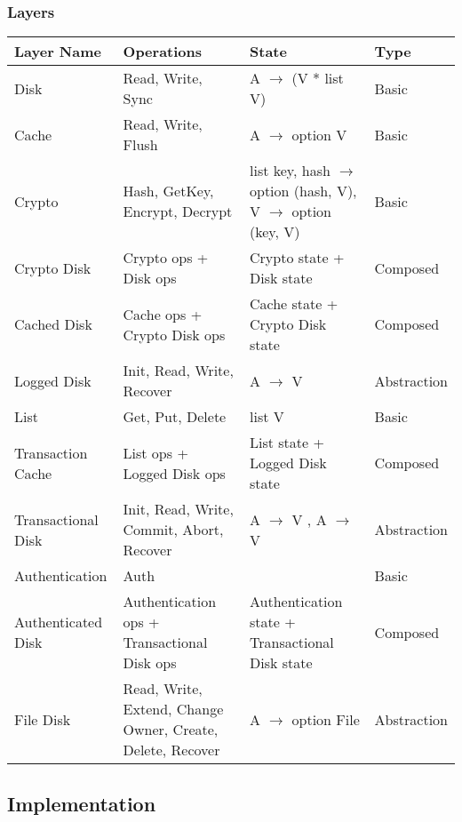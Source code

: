 \documentclass[onecolumn]{paper}
\begin{document}
		\subsubsection{Layers}
			\begin{tabularx}{\linewidth}{|L|L|L|L|}
				\hline
				Layer Name &
				Operations &
				State &
				Type \\
				\hline
				Disk &
				Read, Write, Sync &
				A $\rightarrow$ (V * list V) &
				Basic \\
				\hline
				Cache &
				Read, Write, Flush &
				A $\rightarrow$ option V &
				Basic \\
				\hline
				Crypto &
				Hash, GetKey, Encrypt, Decrypt &
				list key,
				hash $\rightarrow$ option (hash, V),
				V $\rightarrow$ option (key, V) &
				Basic \\
				\hline
				Crypto Disk &
				Crypto ops + Disk ops &
				Crypto state + Disk state &
				Composed \\
				\hline
				Cached Disk &
				Cache ops + Crypto Disk ops &
				Cache state + Crypto Disk state &
				Composed \\
				\hline
				Logged Disk &
				Init, Read, Write, Recover &
				A $\rightarrow$ V &
				Abstraction \\ 
				\hline
				List &
				Get, Put, Delete &
				list V &
				Basic \\
				\hline
				Transaction Cache &
				List ops + Logged Disk ops &
				List state + Logged Disk state &
				Composed \\
				\hline
				Transactional Disk &
				Init, Read, Write, Commit, Abort, Recover &
				A $\rightarrow$ V , A $\rightarrow$ V &
				Abstraction \\
				\hline
				Authentication &
				Auth &
				 &
				Basic \\
				\hline
				Authenticated Disk &
				Authentication ops + Transactional Disk ops &
				Authentication state + Transactional Disk state &
				Composed \\
				\hline
				File Disk &
				Read, Write, Extend, Change Owner, Create, Delete, Recover &
				A $\rightarrow$ option File &
				Abstraction \\
				\hline
			\end{tabularx}
	\subsection{Implementation}
\end{document}
